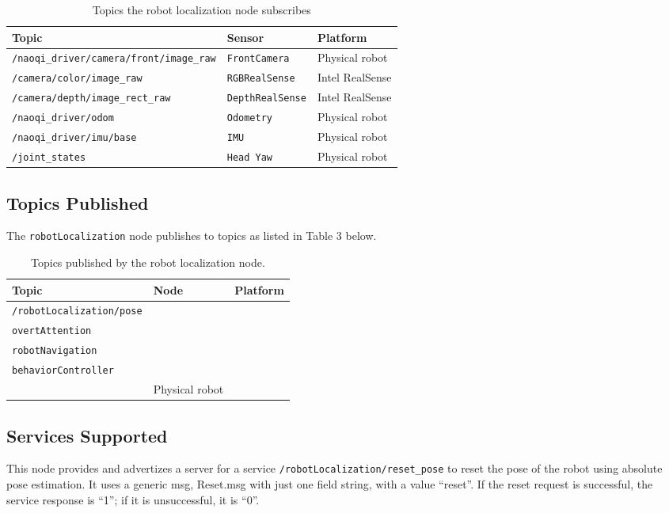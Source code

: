 \documentclass{CSSRforAfrica}
\begin{document}
\begin{table}[H]
\centering
\caption{Topics the robot localization node subscribes}
\label{tab:topics subscribed}
\begin{tabularx}{\textwidth}{|l|l|X|}
\hline
\textbf{Topic} & \textbf{Sensor} & \textbf{Platform} \\ \hline
\verb|/naoqi_driver/camera/front/image_raw| & \verb|FrontCamera| & Physical robot \\ \hline
\verb|/camera/color/image_raw| & \verb|RGBRealSense| & Intel RealSense \\ \hline
\verb|/camera/depth/image_rect_raw| & \verb|DepthRealSense| & Intel RealSense \\ \hline
\verb|/naoqi_driver/odom| & \verb|Odometry| & Physical robot \\ \hline
\verb|/naoqi_driver/imu/base| & \verb|IMU| & Physical robot \\ \hline
\verb|/joint_states| & \verb|Head Yaw| & Physical robot \\ \hline
\end{tabularx}
\end{table}

\subsection*{Topics Published}
The \texttt{robotLocalization} node publishes to topics as listed in Table 3 below.

\begin{table}[H]
\centering
\caption{Topics published by the robot localization node.}
\label{tab:topics published}
\begin{tabularx}{\textwidth}{|l|l|X|}
\hline
\textbf{Topic} & \textbf{Node} & \textbf{Platform} \\ \hline
\texttt{/robotLocalization/pose} & \begin{tabular}{l}
     \verb|gestureExecution| \\
     \verb|overtAttention| \\
     \verb|robotNavigation| \\
     \verb|behaviorController| \\
\end{tabular} & Physical robot \\ \hline
\end{tabularx}
\end{table}

\subsection*{Services Supported}
This node provides and advertizes a server for a service \texttt{/robotLocalization/reset\_pose} to reset the pose of the robot using absolute pose estimation. It uses a generic msg, Reset.msg with just one field string, with a value “reset”. If the reset request is successful, the service response is “1”; if it is unsuccessful, it is “0”.
\end{document}
